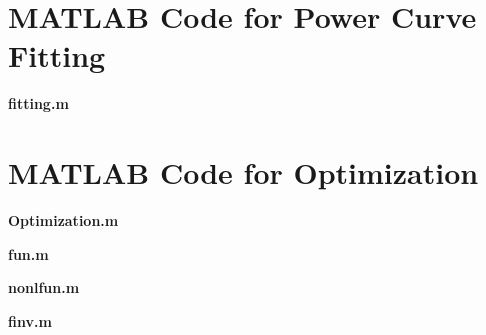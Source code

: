 \begin{appendices}
	
	\section{MATLAB Code for Power Curve Fitting}
	
	\textbf{\textcolor[rgb]{0.98,0.00,0.00}{fitting.m}}
	
	
	\section{MATLAB Code for Optimization}
	
 \textcolor[rgb]{0.98,0.00,0.00}{\textbf{Optimization.m}}
	
	 \textcolor[rgb]{0.98,0.00,0.00}{\textbf{fun.m}}
	
		 \textcolor[rgb]{0.98,0.00,0.00}{\textbf{nonlfun.m}}
	
			 \textcolor[rgb]{0.98,0.00,0.00}{\textbf{finv.m}}
	
\end{appendices}


